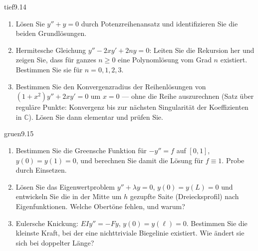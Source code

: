 \begin{karte}{tief}{9.14}{\typtypisch}{}
\begin{enumerate}[label=(\alph*),leftmargin=1.6em,itemsep=2pt]
\item Lösen Sie $y'' + y = 0$ durch Potenzreihenansatz und identifizieren Sie die beiden Grundlösungen.
\item Hermitesche Gleichung $y'' - 2xy' + 2ny = 0$: Leiten Sie die Rekursion her und zeigen Sie, dass für ganzes $n\ge0$ eine Polynomlösung vom Grad $n$ existiert. Bestimmen Sie sie für $n = 0, 1, 2, 3$.
\item Bestimmen Sie den Konvergenzradius der Reihenlösungen von $(1 + x^{2})y'' + 2xy' = 0$ um $x = 0$ --- ohne die Reihe auszurechnen (Satz über reguläre Punkte: Konvergenz bis zur nächsten Singularität der Koeffizienten in $\mathbb C$). Lösen Sie dann elementar und prüfen Sie.
\end{enumerate}
\end{karte}

\begin{karte}{gruen}{9.15}{\typwerk}{}
\begin{enumerate}[label=(\alph*),leftmargin=1.6em,itemsep=2pt]
\item Bestimmen Sie die Greensche Funktion für $-y'' = f$ auf $[0, 1]$, $y(0) = y(1) = 0$, und berechnen Sie damit die Lösung für $f\equiv1$. Probe durch Einsetzen.
\item Lösen Sie das Eigenwertproblem $y'' + \lambda y = 0$, $y(0) = y(L) = 0$ und entwickeln Sie die in der Mitte um $h$ gezupfte Saite (Dreiecksprofil) nach Eigenfunktionen. Welche Obertöne fehlen, und warum?
\item Eulersche Knickung: $EIy'' = -Fy$, $y(0) = y(\ell) = 0$. Bestimmen Sie die kleinste Kraft, bei der eine nichttriviale Biegelinie existiert. Wie ändert sie sich bei doppelter Länge?
\end{enumerate}
\end{karte}

